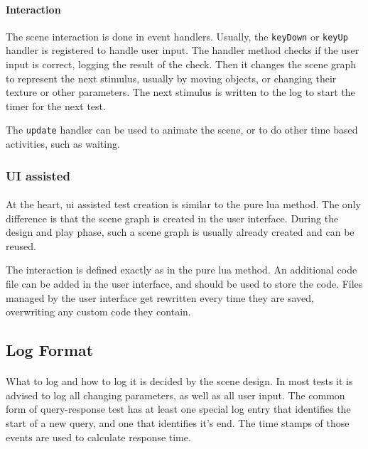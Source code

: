 \paragraph{Interaction}
The scene interaction is done in event handlers.
Usually, the \texttt{keyDown} or \texttt{keyUp} handler is registered to handle user input.
The handler method checks if the user input is correct, logging the result of the check.
Then it changes the scene graph to represent the next stimulus, usually by moving objects, or changing their texture or other parameters.
The next stimulus is written to the log to start the timer for the next test.

The \texttt{update} handler can be used to animate the scene,
or to do other time based activities, such as waiting.


\subsubsection{UI assisted}
\paragraph{}
At the heart, ui assisted test creation is similar to the pure lua method.
The only difference is that the scene graph is created in the user interface.
During the design and play phase, such a scene graph is usually already created and can be reused.

The interaction is defined exactly as in the pure lua method.
An additional code file can be added in the user interface, and should be used to store the code.
Files managed by the user interface get rewritten every time they are saved, overwriting any custom code they contain.


\subsection{Log Format}
\paragraph{}
What to log and how to log it is decided by the scene design.
In most tests it is advised to log all changing parameters, as well as all user input.
The common form of query-response test has at least one special log entry that identifies the start of a new query, and one that identifies it's end.
The time stamps of those events are used to calculate response time.


